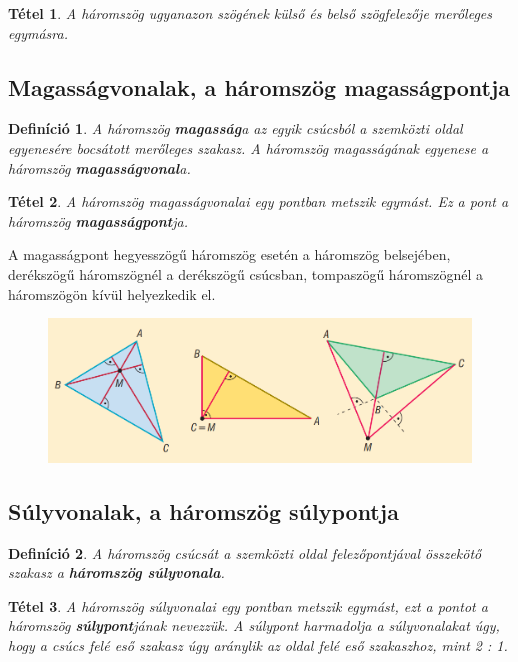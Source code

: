 \documentclass[12pt,a4paper]{article}
\newtheorem{theorem}{Tétel} [section]
\newtheorem{definition}{Definíció} [section]
\begin{document}
\begin{theorem}
A háromszög ugyanazon szögének külső és belső szögfelezője merőleges egymásra.
\end{theorem}

\subsection{Magasságvonalak, a háromszög magasságpontja}

\begin{definition}
A háromszög \textbf{magasság}a az egyik csúcsból a szemközti oldal egyenesére bocsátott merőleges szakasz. A háromszög magasságának egyenese a háromszög \textbf{magasságvonal}a.
\end{definition}

\begin{theorem}
A háromszög magasságvonalai egy pontban metszik egymást. Ez a pont a háromszög \textbf{magasságpont}ja.
\end{theorem}

A magasságpont hegyesszögű háromszög esetén a háromszög belsejében, derékszögű háromszögnél a derékszögű csúcsban, tompaszögű háromszögnél a háromszögön kívül helyezkedik el.
\begin{figure}[h]
\centering
\includegraphics[scale=0.3]{geometry/magassagpont}
\end{figure}
\newpage
\subsection{Súlyvonalak, a háromszög súlypontja}

\begin{definition}
A háromszög csúcsát a szemközti oldal felezőpontjával összekötő szakasz a \textbf{háromszög súlyvonala}.
\end{definition}

\begin{theorem}
A háromszög súlyvonalai egy pontban metszik egymást, ezt a pontot a háromszög \textbf{súlypont}jának nevezzük. A súlypont harmadolja a súlyvonalakat úgy, hogy a csúcs felé eső szakasz úgy aránylik az oldal felé eső szakaszhoz, mint 2 : 1.
\end{theorem}
\end{document}
